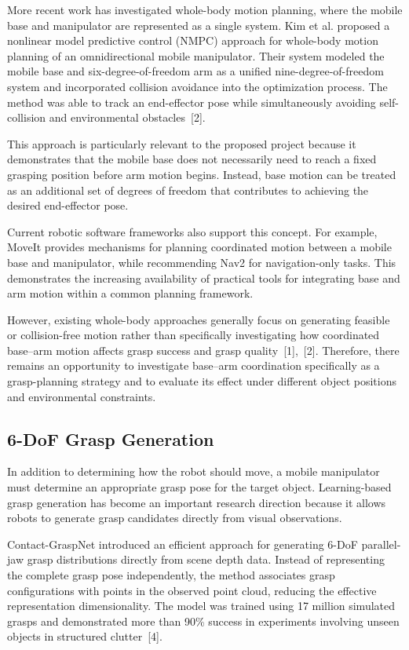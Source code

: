 \documentclass[12pt,a4paper]{article}
\begin{document}
More recent work has investigated whole-body motion planning, where the mobile
base and manipulator are represented as a single system. Kim et al. proposed a nonlinear model
predictive control (NMPC) approach for whole-body motion planning of an omnidirectional
mobile manipulator. Their system modeled the mobile base and six-degree-of-freedom arm as a
unified nine-degree-of-freedom system and incorporated collision avoidance into the
optimization process. The method was able to track an end-effector pose while simultaneously
avoiding self-collision and environmental obstacles~[2].

This approach is particularly relevant to the proposed project because it demonstrates
that the mobile base does not necessarily need to reach a fixed grasping position before arm
motion begins. Instead, base motion can be treated as an additional set of degrees of freedom
that contributes to achieving the desired end-effector pose.

Current robotic software frameworks also support this concept. For example, MoveIt
provides mechanisms for planning coordinated motion between a mobile base and manipulator,
while recommending Nav2 for navigation-only tasks. This demonstrates the increasing
availability of practical tools for integrating base and arm motion within a common planning
framework.

However, existing whole-body approaches generally focus on generating feasible or
collision-free motion rather than specifically investigating how coordinated base--arm motion
affects grasp success and grasp quality~[1],~[2]. Therefore, there remains an opportunity to
investigate base--arm coordination specifically as a grasp-planning strategy and to evaluate its
effect under different object positions and environmental constraints.

\newpage
\subsection*{6-DoF Grasp Generation}

In addition to determining how the robot should move, a mobile manipulator must
determine an appropriate grasp pose for the target object. Learning-based grasp generation has
become an important research direction because it allows robots to generate grasp candidates
directly from visual observations.

Contact-GraspNet introduced an efficient approach for generating 6-DoF parallel-jaw
grasp distributions directly from scene depth data. Instead of representing the complete grasp
pose independently, the method associates grasp configurations with points in the observed
point cloud, reducing the effective representation dimensionality. The model was trained using
17 million simulated grasps and demonstrated more than 90\% success in experiments involving
unseen objects in structured clutter~[4].
\end{document}
